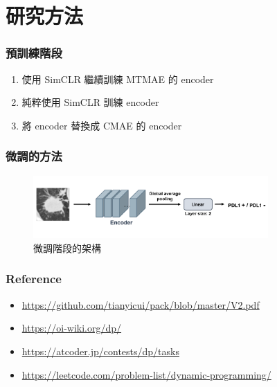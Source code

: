 \documentclass[xcolor=dvipsnames]{beamer}
\begin{document}
    \section{研究方法}
    \begin{frame}
        \sectionpage
    \end{frame}

    \begin{frame}
        \frametitle{預訓練階段}
        \begin{enumerate}
            \item 使用 SimCLR 繼續訓練 MTMAE 的 encoder
            \item 純粹使用 SimCLR 訓練 encoder
            \item 將 encoder 替換成 CMAE 的 encoder
        \end{enumerate}
    \end{frame}

    \begin{frame}
        \frametitle{微調的方法}
        \begin{figure}
            \centering
            \includegraphics[width=0.8\textwidth]{src/finetune.png}
            \caption{微調階段的架構}
            \label{fig:finetune_architecture}
        \end{figure}
    \end{frame}

    \begin{frame}
        \frametitle{Reference}
        \begin{itemize}
            \item \url{https://github.com/tianyicui/pack/blob/master/V2.pdf}
            \item \url{https://oi-wiki.org/dp/}
            \item \url{https://atcoder.jp/contests/dp/tasks}
            \item \url{https://leetcode.com/problem-list/dynamic-programming/}
            
            
        \end{itemize}
    \end{frame}
\end{document}
